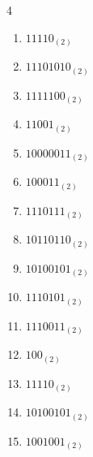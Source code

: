 \begin{multicols}{4}
\begin{enumerate}
        \phantom{$=101$}

  \item $11110_{(2)}$

        \phantom{$=30$}

\columnbreak %

  \item $11101010_{(2)}$

        \phantom{$=234$}

  \item $1111100_{(2)}$

        \phantom{$=124$}

  \item $11001_{(2)}$

        \phantom{$=25$}

  \item $10000011_{(2)}$

        \phantom{$=131$}

  \item $100011_{(2)}$

        \phantom{$=35$}

  \item $1110111_{(2)}$

        \phantom{$=119$}

  \item $10110110_{(2)}$

        \phantom{$=182$}

  \item $10100101_{(2)}$

        \phantom{$=165$}

  \item $1110101_{(2)}$

        \phantom{$=117$}

  \item $1110011_{(2)}$

        \phantom{$=115$}

  \item $100_{(2)}$

        \phantom{$=4$}

  \item $11110_{(2)}$

        \phantom{$=30$}

  \item $10100101_{(2)}$

        \phantom{$=165$}

  \item $1001001_{(2)}$


\end{enumerate}
\end{multicols}

